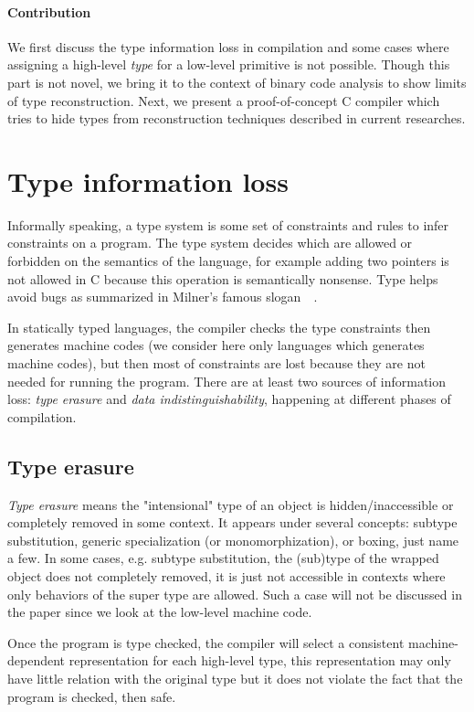 \documentclass[a4paper]{llncs}
\begin{document}
\paragraph{Contribution}
We first discuss the type information loss in compilation and some cases
where assigning a high-level \emph{type} for a low-level primitive
is not possible. Though this part is not novel, we bring it to the context
of binary code analysis to show limits of type reconstruction. Next, we present
a proof-of-concept C compiler which tries to hide types from reconstruction techniques described
in current researches.

\section{Type information loss}
Informally speaking, a type system is some set of constraints and rules to infer constraints
on a program. The type system decides which are allowed or forbidden on the semantics of the language,
for example adding two pointers is not allowed in C because this operation is semantically nonsense.
Type helps avoid bugs as summarized in Milner's famous
slogan~~\cite{milner_theory_1978}.

In statically typed languages, the compiler checks the type constraints then generates
machine codes (we consider here only languages which generates machine codes), but then
most of constraints are lost because they are not needed for running
the program. There are at least two sources of
information loss: \emph{type erasure} and \emph{data indistinguishability},
happening at different phases of compilation.

\subsection{Type erasure}
\emph{Type erasure} means the "intensional" type of an object is hidden/inaccessible or
completely removed in some context. It appears under several concepts: subtype substitution,
generic specialization (or monomorphization), or boxing, just name a few. In some cases,
e.g. subtype substitution, the (sub)type of the wrapped object does not completely removed,
it is just not accessible in contexts where only behaviors of the super type are allowed.
Such a case will not be discussed in the paper since we look at the low-level machine code.

Once the program is type checked,
 the compiler will select a consistent machine-dependent
representation for each high-level type, this representation may only have little
relation with the original type but it does not violate the fact that the program
is checked, then safe.
\end{document}
